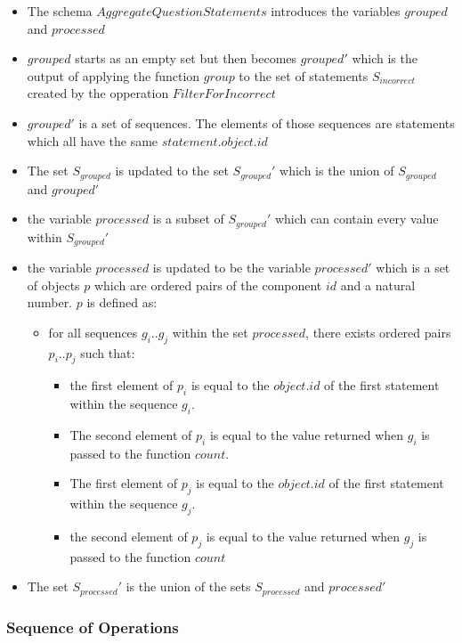 \documentclass{article}
\begin{document}
\begin{itemize}
\item The schema $AggregateQuestionStatements$ introduces the variables
  $grouped$ and $processed$
\item $grouped$ starts as an empty set but then becomes $grouped'$
  which is the output of applying the function $group$ to the set of statements
  $S_{incorrect}$ created by the opperation $FilterForIncorrect$
\item $grouped'$ is a set of sequences. The elements of those
  sequences are statements which all have the same
  $statement.object.id$

\item The set $S_{grouped}$ is updated to the set $S_{grouped}'$ which
  is the union of $S_{grouped}$ and $grouped'$
\item the variable $processed$ is a subset of $S_{grouped}'$ which can
  contain every value within $S_{grouped}'$
\item the variable $processed$ is updated to be the variable
  $processed'$ which is a set of objects $p$ which are ordered pairs
  of the component $id$ and a natural number. $p$ is defined as:
  \begin{itemize}
  \item for all sequences $g_{i}..g_{j}$ within the set $processed$,
    there exists ordered pairs $p_{i}..p_{j}$ such that:
    \begin{itemize}
    \item the first element of $p_{i}$ is equal to the $object.id$ of the first
      statement within the sequence $g_{i}$.
    \item The second element of $p_{i}$ is equal to the value returned
      when $g_{i}$ is passed to the function $count$.

    \item The first element of $p_{j}$ is equal to the $object.id$ of
      the first statement within the sequence $g_{j}$.
    \item the second element of $p_{j}$ is equal to the value returned
      when $g_{j}$ is passed to the function $count$
    \end{itemize}
  \end{itemize}
\item The set $S_{processed}'$ is the union of the sets
  $S_{processed}$ and $processed'$
\end{itemize}

\subsubsection{Sequence of Operations}
\end{document}

